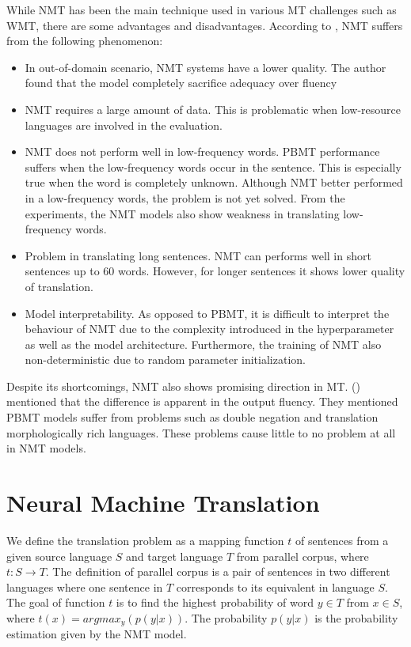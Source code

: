 While NMT has been the main technique used in various MT challenges such as WMT, there are some advantages and disadvantages. According to \cite{koehn2017nmt}, NMT suffers from the following phenomenon:
\begin{itemize}
    \item In out-of-domain scenario, NMT systems have a lower quality. The author found that the model completely sacrifice adequacy over fluency
    \item NMT requires a large amount of data. This is problematic when low-resource languages are involved in the evaluation.
    \item NMT does not perform well in low-frequency words. PBMT performance suffers when the low-frequency words occur in the sentence. This is especially true when the word is completely unknown. Although NMT better performed in a low-frequency words, the problem is not yet solved. From the experiments, the NMT models also show weakness in translating low-frequency words.
    \item Problem in translating long sentences. NMT can performs well in short sentences up to 60 words. However, for longer sentences it shows lower quality of translation.
    \item Model interpretability. As opposed to PBMT, it is difficult to interpret the behaviour of NMT due to the complexity introduced in the hyperparameter as well as the model architecture. Furthermore, the training of NMT also non-deterministic due to random parameter initialization.
\end{itemize}

Despite its shortcomings, NMT also shows promising direction in MT. (\cite{machavcek2018enriching}) mentioned that the difference is apparent in the output fluency. They mentioned PBMT models suffer from problems such as double negation and translation morphologically rich languages. These problems cause little to no problem at all in NMT models.

\section{Neural Machine Translation}
\label{sec:bm_nmt}
We define the translation problem as a mapping function $t$ of sentences from a given source language $S$ and target language $T$ from parallel corpus, where $t : S \rightarrow T$. The definition of parallel corpus is a pair of sentences in two different languages where one sentence in $T$ corresponds to its equivalent in language $S$. The goal of function $t$ is to find the highest probability of word $y \in T$ from $x \in S$, where $t(x) = argmax_y(p(y|x))$. The probability $p(y|x)$ is the probability estimation given by the NMT model.

